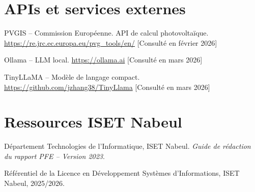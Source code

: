 \section*{APIs et services externes}

\begin{enumerate}[label={[\arabic*]}, resume]
  \item PVGIS -- Commission Européenne. API de calcul photovoltaïque.
    \url{https://re.jrc.ec.europa.eu/pvg_tools/en/}
    [Consulté en février 2026]
  \item Ollama -- LLM local.
    \url{https://ollama.ai}
    [Consulté en mars 2026]
  \item TinyLLaMA -- Modèle de langage compact.
    \url{https://github.com/jzhang38/TinyLlama}
    [Consulté en mars 2026]
\end{enumerate}

\section*{Ressources ISET Nabeul}

\begin{enumerate}[label={[\arabic*]}, resume]
  \item Département Technologies de l'Informatique, ISET Nabeul.
    \textit{Guide de rédaction du rapport PFE -- Version 2023}.
  \item Référentiel de la Licence en Développement Systèmes d'Informations,
    ISET Nabeul, 2025/2026.
\end{enumerate}

\cleardoublepage
